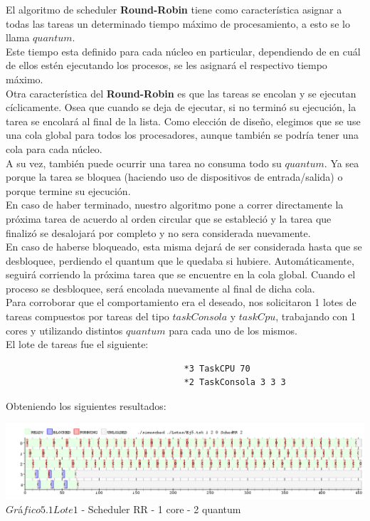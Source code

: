 \indent El algoritmo de scheduler \textbf{Round-Robin} tiene como caracter\'istica asignar a todas las tareas 
un determinado tiempo m\'aximo de procesamiento, a esto se lo llama $quantum$. \\
\indent Este tiempo esta definido para cada n\'ucleo en particular, dependiendo de en cu\'al de ellos est\'en 
ejecutando los procesos, se les asignar\'a el respectivo tiempo m\'aximo.\\
\indent Otra caracter\'istica del \textbf{Round-Robin} es que las tareas se encolan y se ejecutan c\'iclicamente. 
Osea que cuando se deja de ejecutar, si no termin\'o su ejecuci\'on, la tarea se encolar\'a al final de la lista. 
Como elecci\'on de diseño, elegimos que se use una cola global para todos los procesadores, aunque tambi\'en
se podr\'ia tener una cola para cada n\'ucleo. \\
\indent A su vez, tambi\'en puede ocurrir una tarea no consuma todo su $quantum$. 
Ya sea porque la tarea se bloquea (haciendo uso de dispositivos de entrada/salida) o porque termine su ejecuci\'on.\\
\indent En caso de haber terminado, nuestro algoritmo pone a correr directamente la pr\'oxima tarea de acuerdo al orden 
circular que se estableci\'o y la tarea que finaliz\'o se desalojar\'a por completo y no sera considerada nuevamente. \\
\indent En caso de haberse bloqueado, esta misma dejar\'a de ser considerada hasta que se desbloquee, 
perdiendo el quantum que le quedaba si hubiere. 
Autom\'aticamente, seguir\'a corriendo la pr\'oxima tarea que se encuentre en la cola global. 
Cuando el proceso se desbloquee, ser\'a encolada nuevamente al final de dicha cola.   \\

\indent Para corroborar que el comportamiento era el deseado, nos solicitaron 1 lotes de tareas compuestos por tareas
del tipo $taskConsola$ y $taskCpu$, trabajando con 1 cores y utilizando distintos $quantum$ para cada uno de los mismos.\\


El lote de tareas fue el siguiente:
\begin{verbatim}
                                   *3 TaskCPU 70
                                   *2 TaskConsola 3 3 3
\end{verbatim}

Obteniendo los siguientes resultados:

\begin{center}

    
	\includegraphics[width=450pt]{ej5quantum2.png}
	{$Gr$\'a$fico 5.1 Lote 1$ - Scheduler RR - 1 core - 2 quantum}	
 
\end{center}


